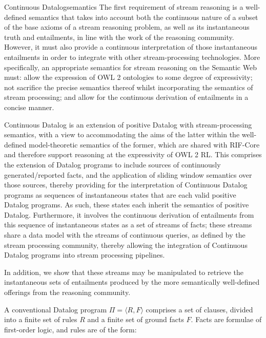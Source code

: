 \begin{nestedsection}{Continuous Datalog}{semantics}
The first requirement of stream reasoning is a well-defined semantics
that takes into account both the continuous nature of a subset of the
base axioms of a stream reasoning problem, as well as its
instantaneous truth and entailments, in line with the work of the
reasoning community.  However, it must also provide a continuous
interpretation of those instantaneous entailments in order to
integrate with other stream-processing technologies.  More
specifically, an appropriate semantics for stream reasoning on the
Semantic Web must: allow the expression of OWL 2 ontologies to some
degree of expressivity; not sacrifice the precise semantics thereof
whilst incorporating the semantics of stream processing; and allow for
the continuous derivation of entailments in a concise manner.

Continuous Datalog is an extension of positive Datalog with
stream-processing semantics, with a view to accommodating the aims of
the latter within the well-defined model-theoretic semantics of the
former, which are shared with RIF-Core \cite{w3crifbld} and therefore
support reasoning at the expressivity of OWL 2 RL.  This comprises the
extension of Datalog programs to include sources of continuously
generated/reported facts, and the application of sliding window
semantics over those sources, thereby providing for the interpretation
of Continuous Datalog programs as sequences of instantaneous states
that are each valid positive Datalog programs.  As such, these states
each inherit the semantics of positive Datalog.  Furthermore, it
involves the continuous derivation of entailments from this sequence
of instantaneous states as a set of streams of facts; these streams
share a data model with the streams of continuous queries, as defined
by the stream processing community, thereby allowing the integration
of Continuous Datalog programs into stream processing pipelines.

In addition, we show that these streams may be manipulated to retrieve
the instantaneous sets of entailments produced by the more
semantically well-defined offerings from the reasoning community.


\begin{definition}[Datalog]

A conventional Datalog program $\Pi = \langle R, F\rangle$ comprises a
set of clauses, divided into a finite set of rules $R$ and a finite
set of ground facts $F$. Facts are formulae of first-order logic, and
rules are of the form:


\end{definition}
\end{nestedsection}
